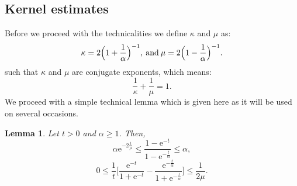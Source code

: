 \documentclass[a4paper,oneside,10pt]{amsproc}
\newtheorem{lemma}{Lemma}
\theoremstyle{remark}
\renewcommand{\leq}{\leqslant}
\renewcommand{\leq}{\leqslant}
\renewcommand{\geq}{\geqslant}
\newcommand{\e}{\mathrm{e}} %
\renewcommand{\leq}{\leqslant}%
\renewcommand{\geq}{\geqslant}%
\begin{document}
\subsection{Kernel estimates}
Before we proceed with the technicalities we define $\kappa$ and
$\mu$ as:
\begin{equation*}
  \kappa = 2\Bigl(1 + \frac1\alpha \Bigr)^{-1}, \: \text{and} \: \mu
  = 2\Bigl(1 - \frac1\alpha \Bigr)^{-1}.
\end{equation*}
such that $\kappa$ and $\mu$ are conjugate exponents, which means:
\begin{equation*}
  \frac1{\kappa} + \frac1{\mu} = 1.
\end{equation*}
We proceed with a simple technical lemma which is given here as it
will be used on several occasions.
\begin{lemma}\label{lem:Time-part-Mehler-time-transform}
  Let $t > 0$ and $\alpha \geq 1$. Then,
  \begin{equation}
    \label{eq:Time-part-Mehler-time-transform-1}
    \alpha \e^{-2\frac{t}{\mu}} \leq \frac{1 -
      \e^{-t}}{1 - \e^{-\frac{t}{\alpha}}} \leq \alpha,
  \end{equation}
  \begin{equation}
    \label{eq:Time-part-Mehler-time-transform-2}
    0 \leq \frac1t \biggl[\frac{\e^{-t}}{1 + \e^{-t}} -
    \frac{\e^{-\frac{t}\alpha}}{1 + \e^{-\frac{t}{\alpha}}} \biggr]
    \leq \frac{1}{2 \mu}.
  \end{equation}
\end{lemma}
\end{document}
